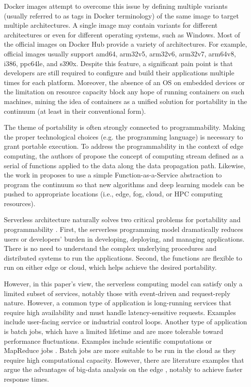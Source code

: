 Docker images attempt to overcome this issue by defining multiple variants (usually referred to as tags in Docker terminology) of the same image to target multiple architectures. A single image may contain variants for different architectures or even for different operating systems, such as Windows. Most of the official images on Docker Hub \cite{docker-hub} provide a variety of architectures. For example, official images usually support amd64, arm32v5, arm32v6, arm32v7, arm64v8, i386, ppc64le, and s390x. Despite this feature, a significant pain point is that developers are still required to configure and build their applications multiple times for each platform. Moreover, the absence of an OS on embedded devices or the limitation on resource capacity block any hope of running containers on such machines, mining the idea of containers as a unified solution for portability in the continuum (at least in their conventional form).

The theme of portability is often strongly connected to programmability. Making the proper technological choices (e.g. the programming language) is necessary to grant portable execution. To address the programmability in the context of edge computing, the authors of \cite{shi2016edge} propose the concept of computing stream defined as a serial of functions applied to the data along the data propagation path. Likewise, the work in \cite{beckman2020harnessing} proposes to use a simple Function-as-a-Service abstraction to program the continuum so that new algorithms and deep learning models can be pushed to appropriate locations (i.e., edge, fog, cloud, or HPC computing resources).

Serverless architecture naturally solves two critical problems for portability and programmability \cite{yi2017lavea}. First, the serverless programming model dramatically reduces users or developers' burden in developing, deploying, and managing applications. There is no need to understand the complex underlying procedures and distributed systems to run the applications. Second, the functions are flexible to run on either edge or cloud, which helps achieve the desired portability.

However, in this paper's view, the serverless computing model can satisfy only a limited subset of services, notably those with event-driven and request-reply nature. However, a common type of application is long-running services that require high availability and must handle latency-sensitive requests. Examples include user-facing service or industrial control loops. Another type of application is batch jobs, which have a limited lifetime and are more tolerable toward performance fluctuations. Examples include scientific computations or MapReduce jobs \cite{condie2010mapreduce}. Batch jobs are more suitable to be run in the cloud as they require high computational capacity. However, there are literature examples that argue the advantages of big-data analysis on the edge \cite{he2017multitier}, notably to achieve faster response times.

